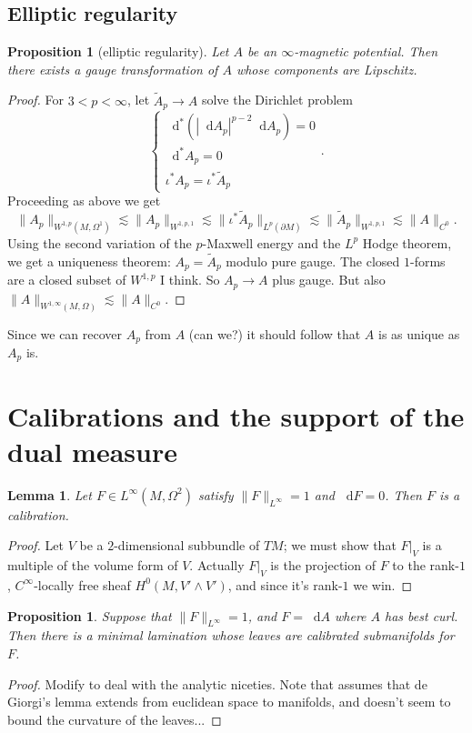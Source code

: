 \documentclass[reqno,11pt]{amsart}
\newcommand*\dif{\mathop{}\!\mathrm{d}}
\newtheorem{lemma}[theorem]{Lemma}
\newtheorem{proposition}[theorem]{Proposition}
\theoremstyle{definition}
\numberwithin{equation}{section}
\begin{document}
\subsection{Elliptic regularity}
\begin{proposition}[elliptic regularity]
Let $A$ be an $\infty$-magnetic potential.
Then there exists a gauge transformation of $A$ whose components are Lipschitz.
\end{proposition}
\begin{proof}
For $3 < p < \infty$, let $\tilde A_p \to A$ solve the Dirichlet problem
$$\begin{cases}
	\dif^*(|\dif A_p|^{p - 2} \dif A_p) = 0 \\
	\dif^* A_p = 0 \\
	\iota^* A_p = \iota^* \tilde A_p
\end{cases}.$$
Proceeding as above we get
$$\|A_p\|_{W^{1, p}(M, \Omega^1)} \lesssim \|A_p\|_{W^{1, p, 1}} \lesssim \|\iota^* \tilde A_p\|_{L^p(\partial M)} \lesssim \|\tilde A_p\|_{W^{1, p, 1}} \lesssim \|A\|_{C^0}.$$
Using the second variation of the $p$-Maxwell energy and the $L^p$ Hodge theorem, we get a uniqueness theorem: $A_p = \tilde A_p$ modulo pure gauge.
The closed $1$-forms are a closed subset of $W^{1, p}$ I think. So $A_p \to A$ plus gauge.
But also $\|A\|_{W^{1, \infty}(M, \Omega)} \lesssim \|A\|_{C^0}$.
\end{proof}

Since we can recover $A_p$ from $A$ (can we?) it should follow that $A$ is as unique as $A_p$ is.


\section{Calibrations and the support of the dual measure}
\begin{lemma}
Let $F \in L^\infty(M, \Omega^2)$ satisfy $\|F\|_{L^\infty} = 1$ and $\dif F = 0$.
Then $F$ is a calibration.
\end{lemma}
\begin{proof}
Let $V$ be a $2$-dimensional subbundle of $TM$; we must show that $F|_V$ is a multiple of the volume form of $V$.
Actually $F|_V$ is the projection of $F$ to the rank-$1$, $C^\infty$-locally free sheaf $H^0(M, V' \wedge V')$, and since it's rank-$1$ we win.
\end{proof}

\begin{proposition}
Suppose that $\|F\|_{L^\infty} = 1$, and $F = \dif A$ where $A$ has best curl.
Then there is a minimal lamination whose leaves are calibrated submanifolds for $F$.
\end{proposition}
\begin{proof}
Modify \cite[Theorem 5.1]{bangert_cui_2017} to deal with the analytic niceties.
Note that \cite{bangert_cui_2017} assumes that de Giorgi's lemma extends from euclidean space to manifolds, and doesn't seem to bound the curvature of the leaves...
\end{proof}
\end{document}
